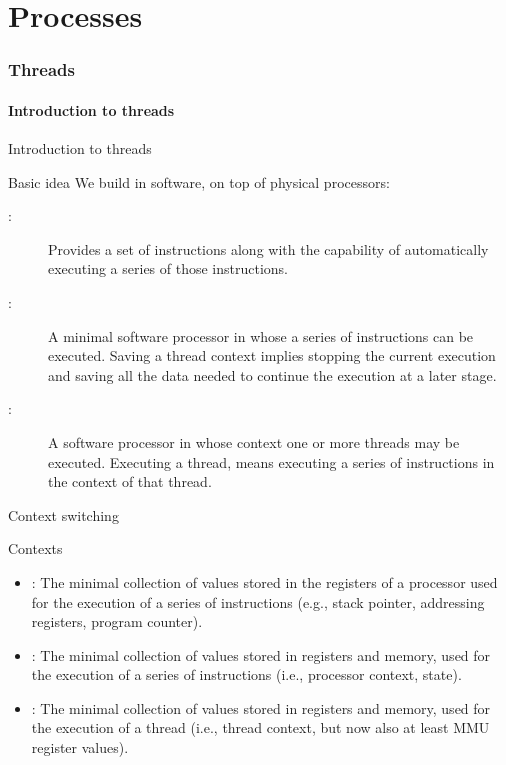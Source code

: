 \part{Processes}
\section{Threads}
\subsection{Introduction to threads}
\begin{slide}{Introduction to threads}
  \begin{block}{Basic idea} 
    We build  in software, on top of physical processors:
    \begin{description}
    \item[:] Provides a set of instructions along with the capability of automatically
      executing a series of those instructions.
    \item[:] A minimal software processor in whose  a series of instructions can be
      executed. Saving a thread context implies stopping the current execution and saving all the data needed
      to continue the execution at a later stage.
    \item[:] A software processor in whose context one or more threads may be executed. Executing
      a thread, means executing a series of instructions in the context of that thread.
    \end{description}
  \end{block}
\end{slide}
\begin{slide}{Context switching}
  \begin{block}{Contexts}
    \begin{itemize}
    \item<1->: The minimal collection of values stored in the registers of a processor
      used for the execution of a series of instructions (e.g., stack pointer, addressing registers, program
      counter).
    \item<2->: The minimal collection of values stored in registers and memory, used for
      the execution of a series of instructions (i.e., processor context, state).
    \item<3->: The minimal collection of values stored in registers and memory, used for
      the execution of a thread (i.e., thread context, but now also at least MMU register values).
    \end{itemize}
  \end{block}
\end{slide}
